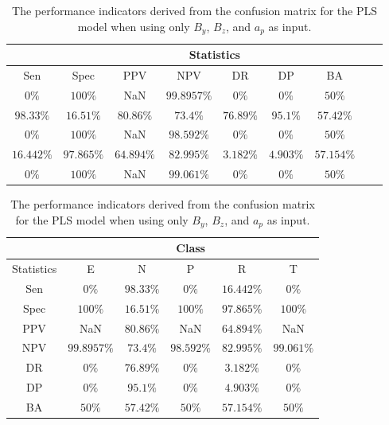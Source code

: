 \begin{table}[!ht]
	\centering
	\begin{tabular}{|c|c|c|c|c|c|c|c|c|}
		\hline
		 & \multicolumn{7}{c|}{Statistics} \\ \hline
		Sen & Spec & PPV & NPV & DR & DP & BA \\ \hline
		$0\%$ & $100\%$ & NaN & $99.8957\%$ & $0\%$ & $0\%$ & $50\%$ \\ \hline
		$98.33\%$ & $16.51\%$ & $80.86\%$ & $73.4\%$ & $76.89\%$ & $95.1\%$ & $57.42\%$ \\ \hline
		$0\%$ & $100\%$ & NaN & $98.592\%$ & $0\%$ & $0\%$ & $50\%$ \\ \hline
		$16.442\%$ & $97.865\%$ & $64.894\%$ & $82.995\%$ & $3.182\%$ & $4.903\%$ & $57.154\%$ \\ \hline
		$0\%$ & $100\%$ & NaN & $99.061\%$ & $0\%$ & $0\%$ & $50\%$ \\ \hline
	\end{tabular}
	\caption{The performance indicators derived from the confusion matrix for the PLS model when using only $B_{y}$, $B_{z}$, and $a_{p}$ as input.}
	\label{tab:cs:yzap:pls}
\end{table}

\begin{table}[!ht]
	\centering
	\begin{tabular}{|c|c|c|c|c|c|}
		\hline
		 & \multicolumn{5}{c|}{Class} \\ \hline
		Statistics & E & N & P & R & T \\ \hline
		Sen & $0\%$ & $98.33\%$ & $0\%$ & $16.442\%$ & $0\%$ \\ \hline
		Spec & $100\%$ & $16.51\%$ & $100\%$ & $97.865\%$ & $100\%$ \\ \hline
		PPV & NaN & $80.86\%$ & NaN & $64.894\%$ & NaN \\ \hline
		NPV & $99.8957\%$ & $73.4\%$ & $98.592\%$ & $82.995\%$ & $99.061\%$ \\ \hline
		DR & $0\%$ & $76.89\%$ & $0\%$ & $3.182\%$ & $0\%$ \\ \hline
		DP & $0\%$ & $95.1\%$ & $0\%$ & $4.903\%$ & $0\%$ \\ \hline
		BA & $50\%$ & $57.42\%$ & $50\%$ & $57.154\%$ & $50\%$ \\ \hline
	\end{tabular}
	\caption{The performance indicators derived from the confusion matrix for the PLS model when using only $B_{y}$, $B_{z}$, and $a_{p}$ as input.}
	\label{tab:cs:reverse:yzap:pls}
\end{table}
